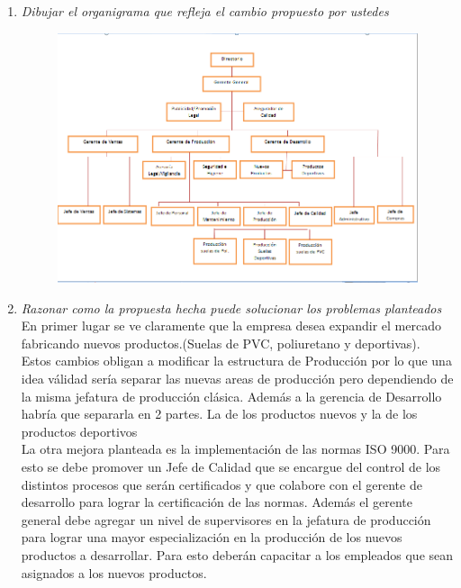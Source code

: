 \documentclass[a4paper,10pt]{article}
\begin{document}
\begin{enumerate}
						
			\item \textit{Dibujar el organigrama que refleja el cambio propuesto por ustedes}\\
			\begin{figure}[!h]
			\includegraphics[width=1\textwidth]{imagenes/SolucionPropuestaGringo.png}
			\end{figure}		
						
			\item \textit{Razonar como la propuesta hecha puede solucionar los problemas planteados}\\
			En primer lugar se ve claramente que la empresa desea expandir el mercado fabricando nuevos productos.(Suelas de PVC, poliuretano y deportivas). Estos cambios obligan a modificar la estructura de Producci\'on por lo que una idea v\'alidad ser\'ia separar las nuevas areas de producci\'on pero dependiendo de la misma jefatura de producci\'on cl\'asica. Adem\'as a la gerencia de Desarrollo habr\'ia que separarla en 2 partes. La de los productos nuevos y la de los productos deportivos\\
			La otra mejora planteada es la implementaci\'on de las normas ISO 9000. Para esto se debe promover un Jefe de Calidad que se encargue del control de los distintos procesos que serán certificados y que colabore con el gerente de desarrollo para lograr la certificación de las normas. Adem\'as el gerente general debe agregar un nivel de supervisores en la jefatura de producción para lograr una mayor especialización en la  producción de los nuevos productos a desarrollar. Para esto deber\'an capacitar a los empleados que sean asignados a los nuevos productos.
			

\end{enumerate}
\end{document}

